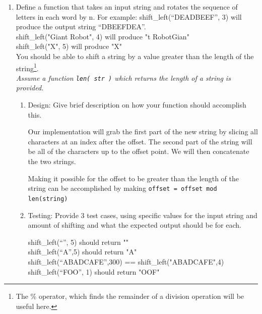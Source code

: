 \documentclass[11pt]{article}
\newenvironment{answer}{\large\lstset{basicstyle=\large}\color{white}}{}
\newenvironment{answer}{\large\lstset{basicstyle=\large}\color{red}}{}
\begin{document}
\begin{enumerate}
\pagebreak
    \item Define a function that takes an input string and rotates the sequence
        of letters in each word by n. For example: shift\_left(``DEADBEEF'', 3)
        will produce the output string ``DBEEFDEA''. \\ shift\_left("Giant Robot", 4) will produce "t RobotGian"\\ 
        shift\_left("X", 5) will produce "X" \\You should be able to
        shift a string by a value greater than the length of the
        string\footnote{The \% operator, which finds the remainder of a
        division operation will be useful here.}.\\ 
        \emph{Assume a function \texttt{len( str )} which returns the length of a string is provided.}


    \begin{enumerate}
        \item Design: Give brief description on how your function should
            accomplish this.

            \begin{answer}
            Our implementation will grab the first part of the new string by
            slicing all characters at an index after the offset. The second
            part of the string will be all of the characters up to the offset
            point. We will then concatenate the two strings.

            Making it possible for the offset to be greater than the length of
            the string can be accomplished by making {\tt offset = offset mod
            len(string)}
            \end{answer}

        \item Testing: Provide 3 test cases, using specific values for the input
            string and amount of shifting and what the expected output should be
            for each.

            \begin{answer}
                shift\_left(``'', 5) should return ""\\
                shift\_left(``A'',5) should return "A"\\
                shift\_left(``ABADCAFE'',300) == shift\_left("ABADCAFE",4)\\
                shift\_left(``FOO'', 1) should return "OOF"
            \end{answer}


\end{enumerate}
\end{enumerate}
\end{document}
